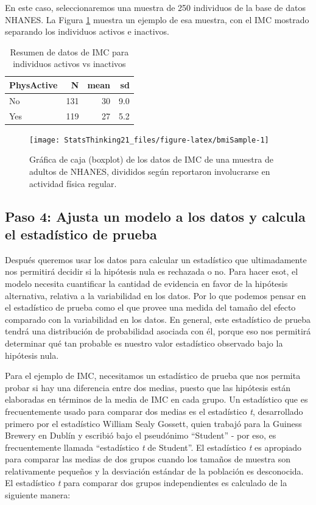 \documentclass[
  12pt,
]{book}
\begin{document}
En este caso, seleccionaremos una muestra de 250 individuos de la base de datos NHANES. La Figura \ref{fig:bmiSample} muestra un ejemplo de esa muestra, con el IMC mostrado separando los individuos activos e inactivos.

\begin{table}

\caption{\label{tab:unnamed-chunk-39}Resumen de datos de IMC para individuos activos vs inactivos}
\centering
\begin{tabular}[t]{l|r|r|r}
\hline
PhysActive & N & mean & sd\\
\hline
No & 131 & 30 & 9.0\\
\hline
Yes & 119 & 27 & 5.2\\
\hline
\end{tabular}
\end{table}

\begin{figure}
\texttt{[image: StatsThinking21\_files/figure-latex/bmiSample-1]} \caption{Gráfica de caja (boxplot) de los datos de IMC de una muestra de adultos de NHANES, divididos según reportaron involucrarse en actividad física regular.}\label{fig:bmiSample}
\end{figure}

\hypertarget{paso-4-ajusta-un-modelo-a-los-datos-y-calcula-el-estaduxedstico-de-prueba}{%
\subsection{Paso 4: Ajusta un modelo a los datos y calcula el estadístico de prueba}\label{paso-4-ajusta-un-modelo-a-los-datos-y-calcula-el-estaduxedstico-de-prueba}}

Después queremos usar los datos para calcular un estadístico que ultimadamente nos permitirá decidir si la hipótesis nula es rechazada o no. Para hacer esot, el modelo necesita cuantificar la cantidad de evidencia en favor de la hipótesis alternativa, relativa a la variabilidad en los datos. Por lo que podemos pensar en el estadístico de prueba como el que provee una medida del tamaño del efecto comparado con la variabilidad en los datos. En general, este estadístico de prueba tendrá una distribución de probabilidad asociada con él, porque eso nos permitirá determinar qué tan probable es nuestro valor estadístico observado bajo la hipótesis nula.

Para el ejemplo de IMC, necesitamos un estadístico de prueba que nos permita probar si hay una diferencia entre dos medias, puesto que las hipótesis están elaboradas en términos de la media de IMC en cada grupo. Un estadístico que es frecuentemente usado para comparar dos medias es el estadístico \emph{t}, desarrollado primero por el estadístico William Sealy Gossett, quien trabajó para la Guiness Brewery en Dublín y escribió bajo el pseudónimo ``Student'' - por eso, es frecuentemente llamada ``estadístico \emph{t} de Student''. El estadístico \emph{t} es apropiado para comparar las medias de dos grupos cuando los tamaños de muestra son relativamente pequeños y la desviación estándar de la población es desconocida. El estadístico \emph{t} para comparar dos grupos independientes es calculado de la siguiente manera:
\end{document}
